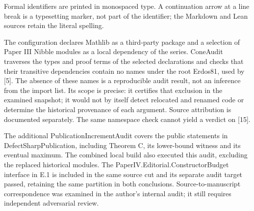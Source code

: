 \documentclass[english,11pt,a4paper]{article}
\begin{document}
Formal identifiers are printed in monospaced type. A continuation arrow at a line break is a typesetting marker, not part of the identifier; the Markdown and Lean sources retain the literal spelling.

The configuration declares Mathlib as a third-party package and a selection of Paper III {\ttfamily\small Nibble} modules as a local dependency of the series. {\ttfamily\small ConeAudit} traverses the types and proof terms of the selected declarations and checks that their transitive dependencies contain no names under the root {\ttfamily\small Erdos81}, used by {[}5{]}. The absence of these names is a reproducible audit result, not an inference from the import list. Its scope is precise: it certifies that exclusion in the examined snapshot; it would not by itself detect relocated and renamed code or determine the historical provenance of each argument. Source attribution is documented separately. The same namespace check cannot yield a verdict on {[}15{]}.

The additional {\ttfamily\small PublicationI\discretionary{\hbox{\ensuremath{\hookrightarrow}}}{}{}ncrementAudi\discretionary{\hbox{\ensuremath{\hookrightarrow}}}{}{}t} covers the public statements in {\ttfamily\small DefectSharpP\discretionary{\hbox{\ensuremath{\hookrightarrow}}}{}{}ublication}, including Theorem C, its lower-bound witness and its eventual maximum. The combined local build also executed this audit, excluding the replaced historical modules. The {\ttfamily\small PaperIV.\discretionary{\hbox{\ensuremath{\hookrightarrow}}}{}{}Editorial.\discretionary{\hbox{\ensuremath{\hookrightarrow}}}{}{}ConstructorB\discretionary{\hbox{\ensuremath{\hookrightarrow}}}{}{}udget} interface in E.1 is included in the same source cut and its separate audit target passed, retaining the same partition in both conclusions. Source-to-manuscript correspondence was examined in the author's internal audit; it still requires independent adversarial review.
\end{document}
